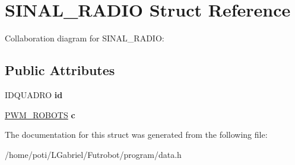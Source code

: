 \hypertarget{structSINAL__RADIO}{}\section{S\+I\+N\+A\+L\+\_\+\+R\+A\+D\+IO Struct Reference}
\label{structSINAL__RADIO}


Collaboration diagram for S\+I\+N\+A\+L\+\_\+\+R\+A\+D\+IO\+:
\subsection*{Public Attributes}
\begin{DoxyCompactItemize}
\item 
I\+D\+Q\+U\+A\+D\+RO {\bfseries id}\hypertarget{structSINAL__RADIO_a8322744b126cccb786a5703f19c87c29}{}\label{structSINAL__RADIO_a8322744b126cccb786a5703f19c87c29}

\item 
\hyperlink{structPWM__ROBOTS}{P\+W\+M\+\_\+\+R\+O\+B\+O\+TS} {\bfseries c}\hypertarget{structSINAL__RADIO_a4e8601f57b6a86e0ec940bdd57abd262}{}\label{structSINAL__RADIO_a4e8601f57b6a86e0ec940bdd57abd262}

\end{DoxyCompactItemize}


The documentation for this struct was generated from the following file\+:\begin{DoxyCompactItemize}
\item 
/home/poti/\+L\+Gabriel/\+Futrobot/program/data.\+h\end{DoxyCompactItemize}
